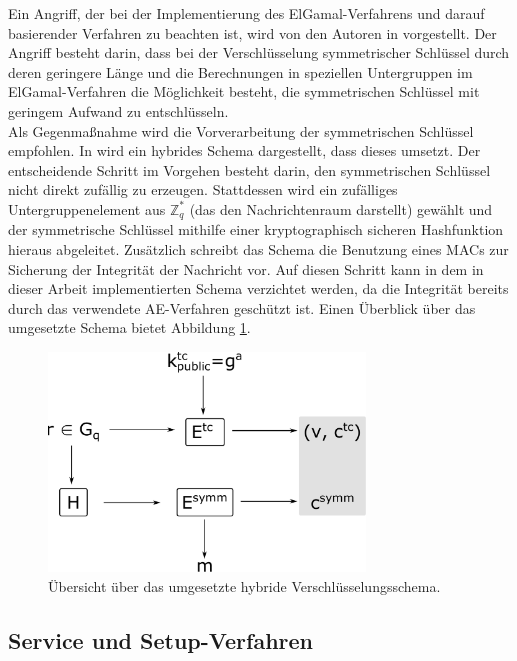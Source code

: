   Ein Angriff, der bei der Implementierung des ElGamal-Verfahrens und darauf basierender Verfahren zu beachten ist, wird von den Autoren in \cite{boneh2000} vorgestellt. Der Angriff besteht darin, dass bei der Verschlüsselung symmetrischer Schlüssel durch deren geringere Länge und die Berechnungen in speziellen Untergruppen im ElGamal-Verfahren die Möglichkeit besteht, die symmetrischen Schlüssel mit geringem Aufwand zu entschlüsseln.\\
  Als Gegenmaßnahme wird die Vorverarbeitung der symmetrischen Schlüssel empfohlen. In \cite{abdalla1999} wird ein hybrides Schema dargestellt, dass dieses umsetzt. Der entscheidende Schritt im Vorgehen besteht darin, den symmetrischen Schlüssel nicht direkt zufällig zu erzeugen. Stattdessen wird ein zufälliges Untergruppenelement aus \(\mathbb{Z}_q^*\) (das den Nachrichtenraum darstellt) gewählt und der symmetrische Schlüssel mithilfe einer kryptographisch sicheren Hashfunktion hieraus abgeleitet. Zusätzlich schreibt das Schema die Benutzung eines MACs zur Sicherung der Integrität der Nachricht vor. Auf diesen Schritt kann in dem in dieser Arbeit implementierten Schema verzichtet werden, da die Integrität bereits durch das verwendete AE-Verfahren geschützt ist. Einen Überblick über das umgesetzte Schema bietet Abbildung \ref{fig:hybrid_scheme}. 
  
  \begin{figure}[]
      \centering
          \includegraphics[width=0.75\textwidth]{dia/hybrid_scheme.pdf}
      \caption{Übersicht über das umgesetzte hybride Verschlüsselungsschema.}
      \label{fig:hybrid_scheme}
  \end{figure}

\subsection{Service und Setup-Verfahren}


